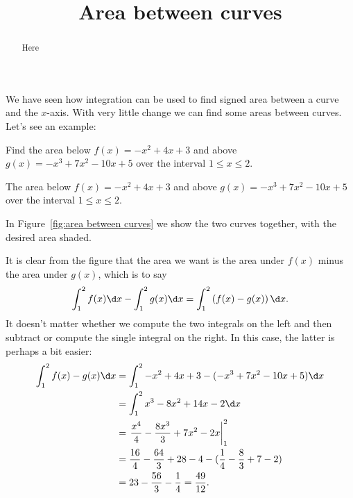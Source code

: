 \documentclass{ximera}
\title[Dig-In:]{Area between curves}
\begin{document}
\begin{abstract}
  Here
\end{abstract}
\maketitle


We have seen how integration can be used to find signed area between a
curve and the $x$-axis. With very little change we can find some areas
between curves. Let's see an example:

\begin{example} Find the area below $f(x)= -x^2+4x+3$ and above
$g(x)=-x^3+7x^2-10x+5$ over the interval $1\le x\le2$. 
\end{example}

\begin{marginfigure}
\caption{The area below $f(x)= -x^2+4x+3$ and above
$g(x)=-x^3+7x^2-10x+5$ over the interval $1\le x\le2$. }
\label{fig:area between curves}
\end{marginfigure}

\begin{solution}
In Figure~\ref{fig:area between curves} we show the two curves
together, with the desired area shaded.

It is clear from the figure that the area we want is the area under
$f(x)$ minus the area under $g(x)$, which is to say
\[
\int_1^2 f(x)\d x-\int_1^2 g(x)\d x = \int_1^2 \left(f(x)-g(x)\right)\d x.
\]
It doesn't matter whether we compute the two integrals on the left and
then subtract or compute the single integral on the right. In this
case, the latter is perhaps a bit easier:
\begin{align*}
  \int_1^2 f(x)-g(x)\d x&=\int_1^2 -x^2+4x+3-(-x^3+7x^2-10x+5)\d x \\
  &=\int_1^2 x^3-8x^2+14x-2\d x \\
  &=\left.{x^4\over4}-{8x^3\over3}+7x^2-2x\right|_1^2 \\
  &={16\over4}-{64\over3}+28-4-({1\over4}-{8\over3}+7-2) \\
  &=23-{56\over3}-{1\over4}={49\over12}.
\end{align*}
\end{solution}
\end{document}
